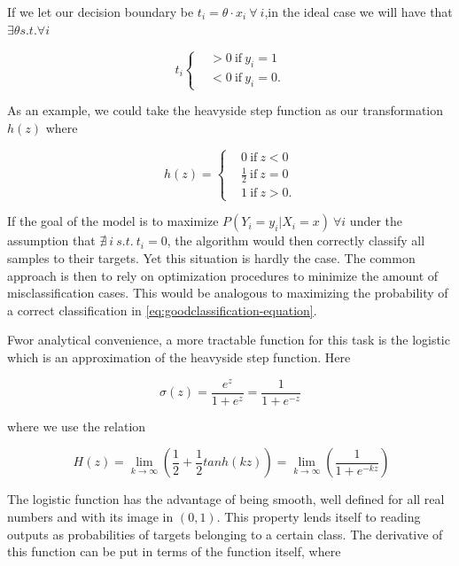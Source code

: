 If we let our decision boundary be $ t_i = \theta \cdot x_i  \ \forall \ i $,in the ideal case we will have that $\exists \theta s.t. \forall i $

\begin{equation}
t_i
\begin{cases}
&>0 \ \mbox{if} \ y_i=1 \\
&<0 \ \mbox{if} \ y_i=0.
\end{cases}
\end{equation}

As an example, we could take the heavyside step function as our transformation $h(z)$  where

\begin{equation}
h(z) =
\begin{cases}
&0 \ \mbox{if} \ z<0 \\
&\frac{1}{2} \ \mbox{if} \  z=0 \\
&1 \ \mbox{if} \  z>0.
\end{cases}
\end{equation}

If the goal of the model is to maximize $P(Y_i = y_i | X_i = x) \ \forall i$
under the assumption that $\nexists\  i \  s.t. \ t_i = 0$, the algorithm would then correctly classify all samples to their targets. Yet this situation is hardly the case. The common approach is then to rely on optimization procedures to minimize the amount of misclassification cases. This would be analogous to maximizing the probability of a correct classification in  \ref{eq:goodclassification-equation}.

Fwor analytical convenience, a more tractable function for this task is the logistic which is an approximation of the heavyside step function. Here

\begin{equation} \label{eq:logisticFunction}
\sigma(z)  = \frac{e^{z}}{1 + e^{z}} = \frac{1}{1 + e^{-z}}
\end{equation}

where  we use the relation

\begin{equation}
 \  H(z) = \lim_{k \to \infty} \left(\frac{1}{2} + \frac{1}{2}tanh(kz) \right) = \lim_{k \to \infty} \left(\frac{1}{1+e^{-kz}} \right)
\end{equation}

The logistic function has the advantage of being smooth, well defined for all real numbers and with its image in $(0,1)$. This property lends itself to reading outputs as probabilities of targets belonging to a certain class. The derivative of this function can be put in terms of the function itself, where

